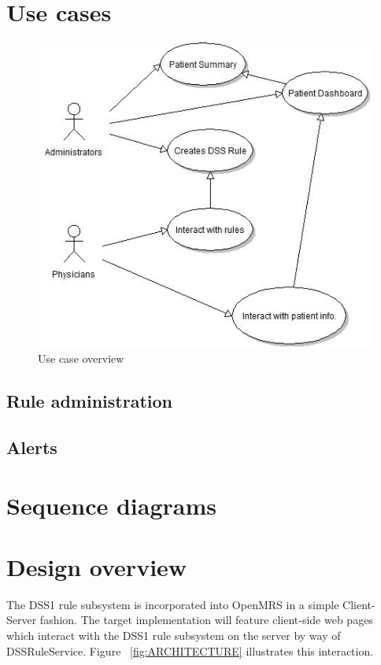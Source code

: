 \documentclass[12pt,letterpaper]{article}
\begin{document}
\newpage 
\section{Use cases}

\begin{figure}\begin{center}
\includegraphics{use_case_diagram.png}
\end{center}
\caption{Use case overview}
\label{fig:USE_CASE_OVERVIEW}
\end{figure}

\subsection{Rule administration}

\subsection{Alerts}

\newpage 
\section{Sequence diagrams}

\newpage 
\section{Design overview} \label{sec:DESIGN_OVERVIEW}

	The DSS1 rule subsystem is incorporated into OpenMRS in a simple Client-Server fashion. The target implementation will feature client-side web pages which interact with the DSS1 rule subsystem on the server by way of DSSRuleService. Figure 
~\ref{fig:ARCHITECTURE} illustrates this interaction.
\end{document}
